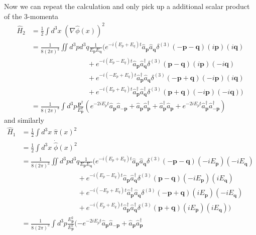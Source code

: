 \documentclass[10pt,a4paper]{report}
\theoremstyle{definition}
\begin{document}
\begin{enumerate}[a)]
Now we can repeat the calculation and only pick up a additional scalar product of the 3-momenta
\begin{align}
\hat{H}_2
&=\frac{1}{2}\int d^3x\;(\nabla\hat\phi(x))^2\\
&=\frac{1}{8(2\pi)^3}\iint d^3pd^3q\frac{1}{E_\mathbf{p}E_\mathbf{q}}(
e^{-i(E_p+E_q)t}\hat{a}_\mathbf{p}\hat{a}_\mathbf{q}\delta^{(3)}(-\mathbf{p}-\mathbf{q})(i\mathbf{p})(i\mathbf{q})\\
&\qquad\qquad\qquad\qquad+
e^{-i(E_p-E_q)t}\hat{a}_\mathbf{p}\hat{a}^\dagger_\mathbf{q}\delta^{(3)}(\mathbf{p}-\mathbf{q})(i\mathbf{p})(-i\mathbf{q})\\
&\qquad\qquad\qquad\qquad+
e^{-i(-E_p+E_q)t}\hat{a}^\dagger_\mathbf{p}\hat{a}_\mathbf{q}\delta^{(3)}(-\mathbf{p}+\mathbf{q})(-i\mathbf{p})(i\mathbf{q})\\
&\qquad\qquad\qquad\qquad+
e^{-i(E_p+E_q)t}\hat{a}^\dagger_\mathbf{p}\hat{a}^\dagger_\mathbf{q}\delta^{(3)}(\mathbf{p}+\mathbf{q})(-i\mathbf{p})(-i\mathbf{q})
)\\
&=\frac{1}{8(2\pi)^3}\int d^3p\frac{\mathbf{p}^2}{E_\mathbf{p}^2}(
e^{-2iE_pt}\hat{a}_\mathbf{p}\hat{a}_\mathbf{-p}
+
\hat{a}_\mathbf{p}\hat{a}^\dagger_\mathbf{p}
+
\hat{a}^\dagger_\mathbf{p}\hat{a}_\mathbf{p}
+
e^{-2iE_pt}\hat{a}^\dagger_\mathbf{p}\hat{a}^\dagger_\mathbf{-p}
)
\end{align}
and similarly
\begin{align}
\hat{H}_1
&=\frac{1}{2}\int d^3x\;\hat\pi(x)^2\\
&=\frac{1}{2}\int d^3x\;\dot{\hat{\phi}}(x)^2\\
&=\frac{1}{8(2\pi)^3}\iint d^3pd^3q\frac{1}{E_\mathbf{p}E_\mathbf{q}}(
e^{-i(E_p+E_q)t}\hat{a}_\mathbf{p}\hat{a}_\mathbf{q}\delta^{(3)}(-\mathbf{p}-\mathbf{q})(-iE_\mathbf{p})(-iE_\mathbf{q})\\
&\qquad\qquad\qquad\qquad+
e^{-i(E_p-E_q)t}\hat{a}_\mathbf{p}\hat{a}^\dagger_\mathbf{q}\delta^{(3)}(\mathbf{p}-\mathbf{q})(-iE_\mathbf{p})(iE_\mathbf{q})\\
&\qquad\qquad\qquad\qquad+
e^{-i(-E_p+E_q)t}\hat{a}^\dagger_\mathbf{p}\hat{a}_\mathbf{q}\delta^{(3)}(-\mathbf{p}+\mathbf{q})(iE_\mathbf{p})(-iE_\mathbf{q})\\
&\qquad\qquad\qquad\qquad+
e^{-i(E_p+E_q)t}\hat{a}^\dagger_\mathbf{p}\hat{a}^\dagger_\mathbf{q}\delta^{(3)}(\mathbf{p}+\mathbf{q})(iE_\mathbf{p})(iE_\mathbf{q})
)\\
&=\frac{1}{8(2\pi)^3}\int d^3p\frac{E_\mathbf{p}^2}{E_\mathbf{p}^2}(-
e^{-2iE_pt}\hat{a}_\mathbf{p}\hat{a}_\mathbf{-p}
+
\hat{a}_\mathbf{p}\hat{a}^\dagger_\mathbf{p}

\end{align}
\end{enumerate}
\end{document}
